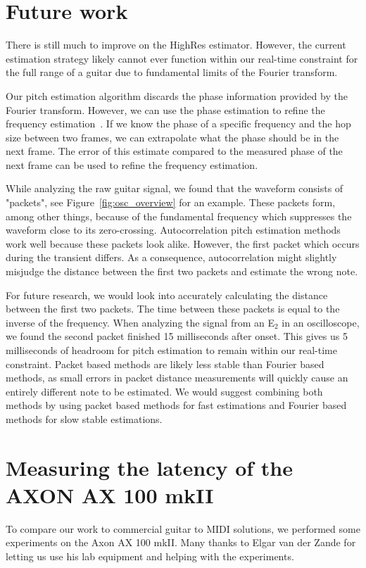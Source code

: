 \documentclass[a4paper,10pt,twocolumn]{article}
\newcommand{\note}[2]{#1${}_{#2}$}
\begin{document}
\section{Future work}  \label{sec:future}
There is still much to improve on the HighRes estimator. However, the current estimation strategy likely cannot ever function within our real-time constraint for the full range of a guitar due to fundamental limits of the Fourier transform.

Our pitch estimation algorithm discards the phase information provided by the Fourier transform. However, we can use the phase estimation to refine the frequency estimation~\cite{phaseinfo}. If we know the phase of a specific frequency and the hop size between two frames, we can extrapolate what the phase should be in the next frame. The error of this estimate compared to the measured phase of the next frame can be used to refine the frequency estimation.

While analyzing the raw guitar signal, we found that the waveform consists of "packets", see Figure~\ref{fig:osc_overview} for an example. These packets form, among other things, because of the fundamental frequency which suppresses the waveform close to its zero-crossing. Autocorrelation pitch estimation methods work well because these packets look alike. However, the first packet which occurs during the transient differs. As a consequence, autocorrelation might slightly misjudge the distance between the first two packets and estimate the wrong note.

For future research, we would look into accurately calculating the distance between the first two packets. The time between these packets is equal to the inverse of the frequency. When analyzing the signal from an \note{E}{2} in an oscilloscope, we found the second packet finished 15 milliseconds after onset. This gives us 5 milliseconds of headroom for pitch estimation to remain within our real-time constraint. Packet based methods are likely less stable than Fourier based methods, as small errors in packet distance measurements will quickly cause an entirely different note to be estimated. We would suggest combining both methods by using packet based methods for fast estimations and Fourier based methods for slow stable estimations.




\appendix
\vspace{+4mm}
\section{Measuring the latency of the AXON AX 100 mkII}  \label{sec:ax100}
To compare our work to commercial guitar to MIDI solutions, we performed some experiments on the Axon AX 100 mkII. Many thanks to Elgar van der Zande for letting us use his lab equipment and helping with the experiments.
\end{document}
